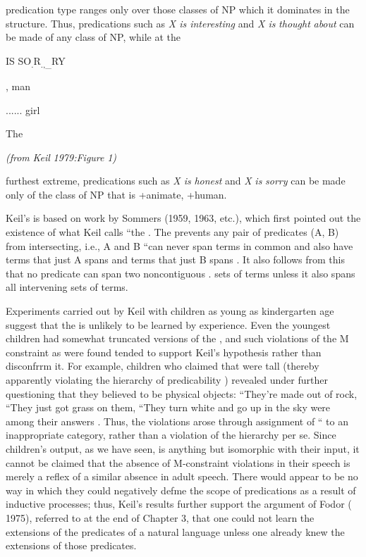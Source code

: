 predication type ranges only over those classes of NP which it domi\-nates in the structure. Thus, predications such as \textit{X is interesting} and \textit{X is} \textit{thought} \textit{about} can be made of any class of NP, while at the


IS SO\textsubscript{.}R\textsubscript{.,}\textsubscript{\_}RY

, man 

...... girl

The 

\textit{(from} \textit{Keil} \textit{1979:Figure} \textit{1)}


furthest extreme, predications such as \textit{X is} \textit{honest} and \textit{X} \textit{is} \textit{sorry} can be made only of the class of NP that is +animate, +human.

Keil's  is based on work by Sommers (1959, 1963, etc.), which first pointed out the existence of what Keil calls ``the . The  prevents any pair of predicates (A, B) from intersecting, i.e., A and B ``can never span terms in com\-mon and also have terms that just A spans and terms that just B spans \citep[16]{Keil1979}. It also follows from this that no predicate can span two noncontiguous . sets of terms unless it also spans all intervening sets of terms.

Experiments carried out by Keil with children as young as kindergarten age suggest that the  is unlikely to be learned by experience. Even the youngest children had somewhat truncated versions of the , and such violations of the M con\-straint as were found tended to support Keil's hypothesis rather than disconfrrm it. For example, children who claimed that  were tall (thereby apparently violating the hierarchy of predicability ) re\-vealed under further questioning that they believed  to be physical objects: ``They're made out of rock,{\textquotedbl} ``They just got grass on them, ``They turn white and go up in the sky were among their answers \citep[110]{Keil1979}. Thus, the violations arose through assignment of `` to an inappropriate category, rather than a violation of the hierarchy per se. Since children's output, as we have seen, is any\-thing but isomorphic with their input, it cannot be claimed that the absence of M-constraint violations in their speech is merely a reflex of a similar absence in adult speech. There would appear to be no way in which they could negatively defme the scope of predications as a result of inductive processes; thus, Keil's results further support the argument of Fodor ( 1975), referred to at the end of Chapter 3, that one could not learn the extensions of the predicates of a natural lan\-guage unless one already knew the extensions of those predicates.

